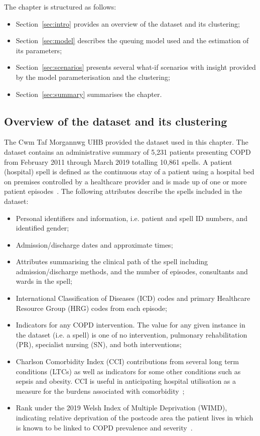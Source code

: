 The chapter is structured as follows:

\begin{itemize}
    \item Section~\ref{sec:intro} provides an overview of the dataset and its
        clustering;
    \item Section~\ref{sec:model} describes the queuing model used and the
        estimation of its parameters;
    \item Section~\ref{sec:scenarios} presents several what-if scenarios with
        insight provided by the model parameterisation and the clustering;
    \item Section~\ref{sec:summary} summarises the chapter.
\end{itemize}


\subsection{Overview of the dataset and its clustering}\label{subsec:overview}

The Cwm Taf Morgannwg UHB provided the dataset used in this chapter. The
dataset contains an administrative summary of 5,231 patients presenting COPD
from February 2011 through March 2019 totalling 10,861 spells. A patient
(hospital) spell is defined as the continuous stay of a patient using a hospital
bed on premises controlled by a healthcare provider and is made up of one or
more patient episodes~\cite{NHS2020}. The following attributes describe the
spells included in the dataset:

\begin{itemize}
    \item Personal identifiers and information, i.e. patient and spell ID
        numbers, and identified gender;
    \item Admission/discharge dates and approximate times;
    \item Attributes summarising the clinical path of the spell including
        admission/discharge methods, and the number of episodes, consultants and
        wards in the spell;
    \item International Classification of Diseases (ICD) codes and primary
        Healthcare Resource Group (HRG) codes from each episode;
    \item Indicators for any COPD intervention. The value for any given instance
        in the dataset (i.e. a spell) is one of no intervention, pulmonary
        rehabilitation (PR), specialist nursing (SN), and both interventions;
    \item Charlson Comorbidity Index (CCI) contributions from several long term
        conditions (LTCs) as well as indicators for some other conditions such
        as sepsis and obesity. CCI is useful in anticipating hospital
        utilisation as a measure for the burdens associated with
        comorbidity~\cite{Simon2011};
    \item Rank under the 2019 Welsh Index of Multiple Deprivation (WIMD),
        indicating relative deprivation of the postcode area the patient lives
        in which is known to be linked to COPD prevalence and
        severity~\cite{Collins2018,Sexton2016,Steiner2017}.
\end{itemize}

